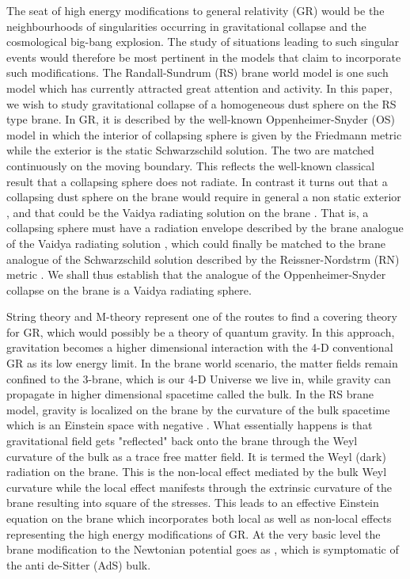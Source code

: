 \documentclass[a4paper,twocolumn,showpacs,preprintnumbers,amsmath,amssymb]{revtex4}
\begin{document}
The seat of high energy modifications to general relativity (GR) would be
the neighbourhoods of singularities occurring in gravitational collapse and
the cosmological big-bang explosion. The study of situations leading to such
singular events would therefore be most pertinent in the models that claim
to incorporate such modifications. The Randall-Sundrum (RS) brane world 
model \cite{r1} is one such model which has currently attracted great 
attention and 
activity. In this paper, we wish to study
gravitational collapse of a homogeneous dust sphere on the RS type brane. 
In GR, it is described by the well-known
Oppenheimer-Snyder (OS) model \cite{n1} in which the interior of 
collapsing sphere
is given by the Friedmann metric while the exterior is the static 
Schwarzschild solution. The two are matched continuously on the moving
boundary. This reflects the well-known classical result that a 
collapsing sphere does not radiate. In contrast it turns out that a 
collapsing dust sphere on the brane would require in general a non static 
exterior \cite{r}, and that could be the Vaidya radiating solution on the 
brane \cite{n2}.
That is, a collapsing sphere must have a radiation envelope 
described by the brane analogue of the Vaidya radiating solution \cite{n2}, 
which could finally be matched to the brane analogue of the Schwarzschild 
solution described by the Reissner-Nordstr\coordHE{}m (RN) metric 
\cite{r6}. We shall thus establish that the analogue of the 
Oppenheimer-Snyder collapse on the brane is a Vaidya radiating sphere. 


String theory and M-theory represent one of the routes to find a
covering theory for GR, which would possibly be a theory of quantum gravity.
In this approach, gravitation becomes a higher
dimensional interaction with the 4-D conventional GR as its low energy
limit. In the brane world scenario, the matter fields remain confined to the
3-brane, which is our 4-D Universe we live in, while gravity can propagate
in higher dimensional spacetime called the bulk. In the RS brane model,
gravity is localized on the brane by the curvature of
the bulk spacetime which is an Einstein space with negative \myHighlight{$\Lambda$}\coordHE{}.
What essentially happens is that gravitational field gets "reflected" back
onto the brane through the Weyl curvature of the bulk as a trace free matter
field. It is termed the Weyl (dark) radiation on the brane. This is the
non-local effect mediated by the bulk Weyl
curvature while the local effect manifests through the extrinsic curvature
of the brane resulting into square of the stresses.
This leads to an effective Einstein 
equation on the brane \cite{r2} which
incorporates both local as well as non-local effects representing the high
energy modifications of GR. At the very basic level the brane modification to 
the Newtonian potential goes as \coordHE{}, which is symptomatic of the anti 
de-Sitter (AdS\coordHE{}) bulk.
\end{document}
